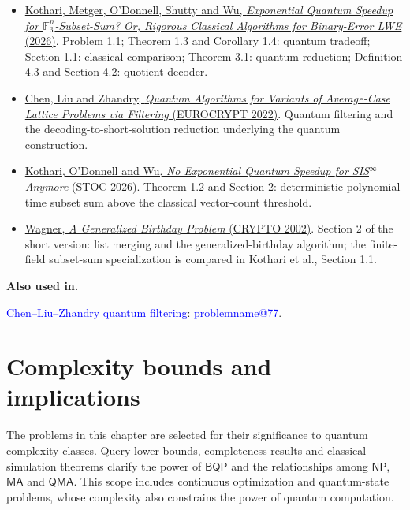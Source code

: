 \documentclass[11pt,a4paper]{article}
\makeatletter
\theoremstyle{problemstyle}
\newcommand{\subhead}[1]{\Needspace{4\baselineskip}\par\vspace{5pt}{\bfseries #1\par}\vspace{1pt}}
\newenvironment{algorithmindex}[1]{%
  \begin{itemize}[label=\textbullet,leftmargin=1.3em,labelsep=0.6em,itemsep=4pt,topsep=3pt,parsep=0pt]
  \small
}{\end{itemize}}
\newcommand{\problemref}[1]{\hyperref[entry:#1]{\textcolor{blue}{\csname problemname@#1\endcsname}}}
\newcommand{\algorithmref}[2]{\hyperref[algorithm:#1]{\textcolor{blue}{#2}}}
\makeatother
\begin{document}
\subhead{Algorithm: Kothari--Metger--O'Donnell--Shutty--Wu vector subset sum}
\begin{algorithmindex}{101}
\item \href{https://arxiv.org/html/2609.40321v1}{Kothari, Metger, O'Donnell, Shutty and Wu, \emph{Exponential Quantum Speedup for $\mathbb F_3^n$-Subset-Sum? Or, Rigorous Classical Algorithms for Binary-Error LWE} (2026)}. Problem 1.1; Theorem 1.3 and Corollary 1.4: quantum tradeoff; Section 1.1: classical comparison; Theorem 3.1: quantum reduction; Definition 4.3 and Section 4.2: quotient decoder.
\item \href{https://arxiv.org/abs/2108.11015}{Chen, Liu and Zhandry, \emph{Quantum Algorithms for Variants of Average-Case Lattice Problems via Filtering} (EUROCRYPT 2022)}. Quantum filtering and the decoding-to-short-solution reduction underlying the quantum construction.
\item \href{https://arxiv.org/html/2510.07515v3}{Kothari, O'Donnell and Wu, \emph{No Exponential Quantum Speedup for SIS$^\infty$ Anymore} (STOC 2026)}. Theorem 1.2 and Section 2: deterministic polynomial-time subset sum above the classical vector-count threshold.
\item \href{https://people.eecs.berkeley.edu/~daw/papers/genbday.html}{Wagner, \emph{A Generalized Birthday Problem} (CRYPTO 2002)}. Section 2 of the short version: list merging and the generalized-birthday algorithm; the finite-field subset-sum specialization is compared in Kothari et al., Section 1.1.
\end{algorithmindex}
\par{}\begingroup\small
\textbf{Also used in.}
\par\algorithmref{clz-filtering}{Chen--Liu--Zhandry quantum filtering}: \problemref{77}.
\par\endgroup

\clearpage
\section{Complexity bounds and implications}
\label{chapter:complexity}


The problems in this chapter are selected for their significance to quantum complexity classes. Query lower bounds, completeness results and classical simulation theorems clarify the power of $\mathsf{BQP}$ and the relationships among $\mathsf{NP}$, $\mathsf{MA}$ and $\mathsf{QMA}$. This scope includes continuous optimization and quantum-state problems, whose complexity also constrains the power of quantum computation.
\end{document}
